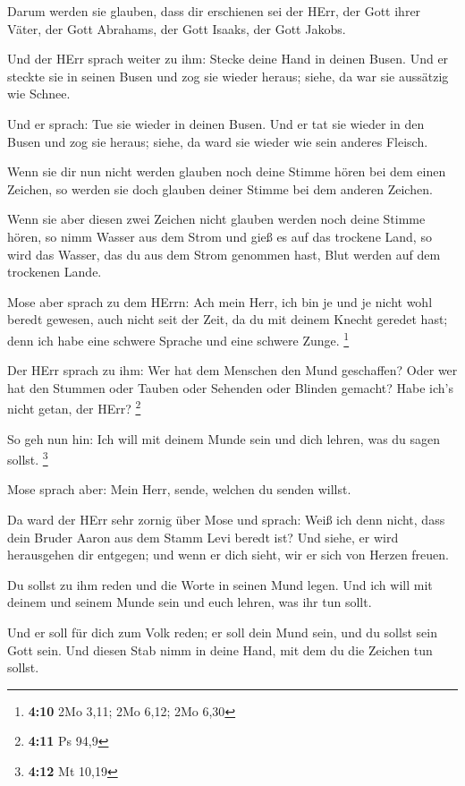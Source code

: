  Darum werden sie glauben, dass dir erschienen sei der HErr,
der Gott ihrer Väter, der Gott Abrahams, der Gott Isaaks, der Gott
Jakobs.

 Und der HErr sprach weiter zu ihm: Stecke deine Hand in
deinen Busen. Und er steckte sie in seinen Busen und zog sie wieder
heraus; siehe, da war sie aussätzig wie Schnee.

 Und er sprach: Tue sie wieder in deinen Busen. Und er tat
sie wieder in den Busen und zog sie heraus; siehe, da ward sie wieder
wie sein anderes Fleisch.

 Wenn sie dir nun nicht werden glauben noch deine Stimme
hören bei dem einen Zeichen, so werden sie doch glauben deiner Stimme
bei dem anderen Zeichen.

 Wenn sie aber diesen zwei Zeichen nicht glauben werden noch
deine Stimme hören, so nimm Wasser aus dem Strom und gieß es auf das
trockene Land, so wird das Wasser, das du aus dem Strom genommen hast,
Blut werden auf dem trockenen Lande.

 Mose aber sprach zu dem HErrn: Ach mein Herr, ich bin je
und je nicht wohl beredt gewesen, auch nicht seit der Zeit, da du mit
deinem Knecht geredet hast; denn ich habe eine schwere Sprache und eine
schwere Zunge. \footnote{\textbf{4:10} 2Mo 3,11; 2Mo 6,12; 2Mo 6,30}

 Der HErr sprach zu ihm: Wer hat dem Menschen den Mund
geschaffen? Oder wer hat den Stummen oder Tauben oder Sehenden oder
Blinden gemacht? Habe ich's nicht getan, der HErr? \footnote{\textbf{4:11}
  Ps 94,9}

 So geh nun hin: Ich will mit deinem Munde sein und dich
lehren, was du sagen sollst. \footnote{\textbf{4:12} Mt 10,19}

 Mose sprach aber: Mein Herr, sende, welchen du senden
willst.

 Da ward der HErr sehr zornig über Mose und sprach: Weiß
ich denn nicht, dass dein Bruder Aaron aus dem Stamm Levi beredt ist?
Und siehe, er wird herausgehen dir entgegen; und wenn er dich sieht, wir
er sich von Herzen freuen.

 Du sollst zu ihm reden und die Worte in seinen Mund legen.
Und ich will mit deinem und seinem Munde sein und euch lehren, was ihr
tun sollt.

 Und er soll für dich zum Volk reden; er soll dein Mund
sein, und du sollst sein Gott sein.  Und diesen Stab nimm
in deine Hand, mit dem du die Zeichen tun sollst.

